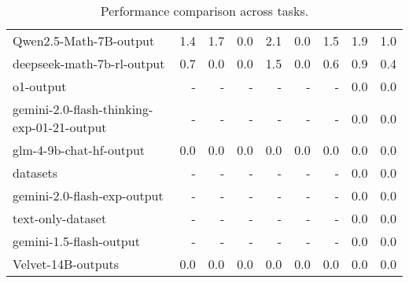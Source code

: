\begin{table*}[t]
\begin{tabularx}{\linewidth}{l r r r r r r r r }
Qwen2.5-Math-7B-output & 1.4 & 1.7 & 0.0 & 2.1 & 0.0 & 1.5 & 1.9 & 1.0 \\
deepseek-math-7b-rl-output & 0.7 & 0.0 & 0.0 & 1.5 & 0.0 & 0.6 & 0.9 & 0.4 \\
o1-output & - & - & - & - & - & - & 0.0 & 0.0 \\
gemini-2.0-flash-thinking-exp-01-21-output & - & - & - & - & - & - & 0.0 & 0.0 \\
glm-4-9b-chat-hf-output & 0.0 & 0.0 & 0.0 & 0.0 & 0.0 & 0.0 & 0.0 & 0.0 \\
datasets & - & - & - & - & - & - & 0.0 & 0.0 \\
gemini-2.0-flash-exp-output & - & - & - & - & - & - & 0.0 & 0.0 \\
text-only-dataset & - & - & - & - & - & - & 0.0 & 0.0 \\
gemini-1.5-flash-output & - & - & - & - & - & - & 0.0 & 0.0 \\
Velvet-14B-outputs & 0.0 & 0.0 & 0.0 & 0.0 & 0.0 & 0.0 & 0.0 & 0.0 \\
\bottomrule
\end{tabularx}
\caption{Performance comparison across tasks.}
\label{tab:llm-accuracy}
\end{table*}

